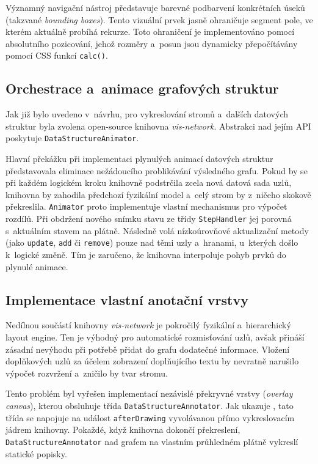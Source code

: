 Významný navigační nástroj představuje barevné podbarvení konkrétních úseků (takzvané \textit{bounding boxes}).
Tento vizuální prvek jasně ohraničuje segment pole, ve kterém aktuálně probíhá rekurze.
Toto ohraničení je implementováno pomocí absolutního pozicování, jehož rozměry a~posun jsou dynamicky přepočítávány pomocí CSS funkcí \texttt{calc()}.

\subsection{Orchestrace a~animace grafových struktur}
\label{subsec:graph-animator}

Jak již bylo uvedeno v~návrhu, pro vykreslování stromů a~dalších datových struktur byla zvolena open-source knihovna \textit{vis-network}.
Abstrakci nad jejím API poskytuje \texttt{DataStructureAnimator}.

Hlavní překážku při implementaci plynulých animací datových struktur představovala eliminace nežádoucího problikávání výsledného grafu.
Pokud by se při každém logickém kroku knihovně podstrčila zcela nová datová sada uzlů, knihovna by zahodila předchozí fyzikální model a~celý strom by z~ničeho skokově překreslila.
\texttt{Animator} proto implementuje vlastní mechanismus pro výpočet rozdílů.
Při obdržení nového snímku stavu ze třídy \texttt{StepHandler} jej porovná s~aktuálním stavem na plátně.
Následně volá nízkoúrovňové aktualizační metody (jako \texttt{update}, \texttt{add} či \texttt{remove}) pouze nad těmi uzly a~hranami, u~kterých došlo k~logické změně.
Tím je zaručeno, že knihovna interpoluje pohyb prvků do plynulé animace.

\subsection{Implementace vlastní anotační vrstvy}
\label{subsec:custom-annotator}

Nedílnou součástí knihovny \textit{vis-network} je pokročilý fyzikální a~hierarchický layout engine.
Ten je výhodný pro automatické rozmisťování uzlů, avšak přináší zásadní nevýhodu při potřebě přidat do grafu dodatečné informace.
Vložení doplňkových uzlů za účelem zobrazení doplňujícího textu by nevratně narušilo výpočet rozvržení a~zničilo by tvar stromu.

Tento problém byl vyřešen implementací nezávislé překryvné vrstvy (\textit{overlay canvas}), kterou obsluhuje třída \texttt{DataStructureAnnotator}.
Jak ukazuje , tato třída se napojuje na událost \texttt{afterDrawing} vyvolávanou přímo vykreslovacím jádrem knihovny.
Pokaždé, když knihovna dokončí překreslení, \texttt{DataStructureAnnotator} nad grafem na vlastním průhledném plátně vykreslí statické popisky.

